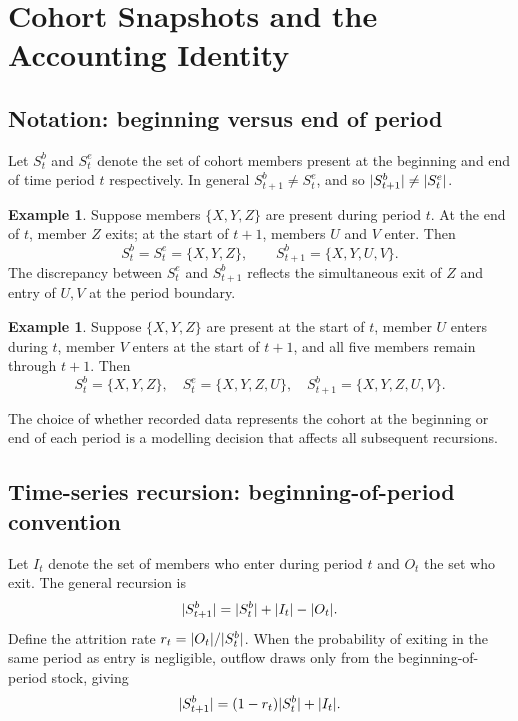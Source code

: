 \documentclass[a4paper,oneside,12pt]{extarticle}
\theoremstyle{plain}
\theoremstyle{definition}
\newtheorem{example}[proposition]{Example}
\theoremstyle{remark}
\DeclarePairedDelimiter{\abs}{\lvert}{\rvert}
\begin{document}
\section{Cohort Snapshots and the Accounting Identity}
\label{sec:snapshots}

\subsection{Notation: beginning versus end of period}

Let $S_t^b$ and $S_t^e$ denote the set of cohort members present at the
beginning and end of time period $t$ respectively. In general
$S_{t+1}^b \neq S_t^e$, and so $\abs{S_{t+1}^b} \neq \abs{S_t^e}$.

\begin{example}
Suppose members $\{X,Y,Z\}$ are present during period $t$. At the end of
$t$, member $Z$ exits; at the start of $t+1$, members $U$ and $V$ enter.
Then
\[
S_t^b = S_t^e = \{X,Y,Z\}, \qquad
S_{t+1}^b = \{X,Y,U,V\}.
\]
The discrepancy between $S_t^e$ and $S_{t+1}^b$ reflects the simultaneous
exit of $Z$ and entry of $U,V$ at the period boundary.
\end{example}

\begin{example}
Suppose $\{X,Y,Z\}$ are present at the start of $t$, member $U$ enters
during $t$, member $V$ enters at the start of $t+1$, and all five members
remain through $t+1$. Then
\[
S_t^b = \{X,Y,Z\},\quad
S_t^e = \{X,Y,Z,U\},\quad
S_{t+1}^b = \{X,Y,Z,U,V\}.
\]
\end{example}

The choice of whether recorded data represents the cohort at the beginning
or end of each period is a modelling decision that affects all subsequent
recursions.

\subsection{Time-series recursion: beginning-of-period convention}

Let $I_t$ denote the set of members who enter during period $t$ and $O_t$
the set who exit. The general recursion is
\begin{equation}
\label{eq:main_equation_1}
\abs{S_{t+1}^b} = \abs{S_t^b} + \abs{I_t} - \abs{O_t}.
\end{equation}
Define the attrition rate $r_t = \abs{O_t}/\abs{S_t^b}$. When the
probability of exiting in the same period as entry is negligible, outflow
draws only from the beginning-of-period stock, giving
\begin{equation}
\label{eq:main_equation_2}
\abs{S_{t+1}^b} = (1-r_t)\abs{S_t^b} + \abs{I_t}.
\end{equation}
\end{document}
